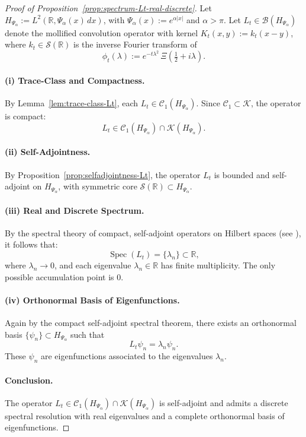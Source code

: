 \begin{proof}[Proof of Proposition~\ref{prop:spectrum-Lt-real-discrete}]
Let \( H_{\Psi_\alpha} := L^2(\mathbb{R}, \Psi_\alpha(x)\, dx) \), with \( \Psi_\alpha(x) := e^{\alpha |x|} \) and \( \alpha > \pi \). Let \( L_t \in \mathcal{B}(H_{\Psi_\alpha}) \) denote the mollified convolution operator with kernel \( K_t(x,y) := k_t(x - y) \), where \( k_t \in \mathcal{S}(\mathbb{R}) \) is the inverse Fourier transform of
\[
\phi_t(\lambda) := e^{-t\lambda^2} \, \Xi\left( \tfrac{1}{2} + i\lambda \right).
\]

\paragraph{(i) Trace-Class and Compactness.}
By Lemma~\ref{lem:trace-class-Lt}, each \( L_t \in \mathcal{C}_1(H_{\Psi_\alpha}) \). Since \( \mathcal{C}_1 \subset \mathcal{K} \), the operator is compact:
\[
L_t \in \mathcal{C}_1(H_{\Psi_\alpha}) \cap \mathcal{K}(H_{\Psi_\alpha}).
\]

\paragraph{(ii) Self-Adjointness.}
By Proposition~\ref{prop:selfadjointness-Lt}, the operator \( L_t \) is bounded and self-adjoint on \( H_{\Psi_\alpha} \), with symmetric core \( \mathcal{S}(\mathbb{R}) \subset H_{\Psi_\alpha} \).

\paragraph{(iii) Real and Discrete Spectrum.}
By the spectral theory of compact, self-adjoint operators on Hilbert spaces (see \cite[Thm.~VI.16]{ReedSimon1980I}), it follows that:
\[
\operatorname{Spec}(L_t) = \{ \lambda_n \} \subset \mathbb{R},
\]
where \( \lambda_n \to 0 \), and each eigenvalue \( \lambda_n \in \mathbb{R} \) has finite multiplicity. The only possible accumulation point is 0.

\paragraph{(iv) Orthonormal Basis of Eigenfunctions.}
Again by the compact self-adjoint spectral theorem, there exists an orthonormal basis \( \{ \psi_n \} \subset H_{\Psi_\alpha} \) such that
\[
L_t \psi_n = \lambda_n \psi_n.
\]
These \( \psi_n \) are eigenfunctions associated to the eigenvalues \( \lambda_n \).

\paragraph{Conclusion.}
The operator \( L_t \in \mathcal{C}_1(H_{\Psi_\alpha}) \cap \mathcal{K}(H_{\Psi_\alpha}) \) is self-adjoint and admits a discrete spectral resolution with real eigenvalues and a complete orthonormal basis of eigenfunctions.
\end{proof}
% 